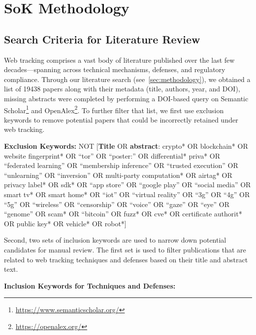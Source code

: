 \section{SoK Methodology}
\label{sec:appendix-methodology}

\subsection{Search Criteria for Literature Review}
\label{sec:keywords}

Web tracking comprises a vast body of literature published over the last few decades---spanning across technical mechanisms, defenses, and regulatory compliance. Through our literature search (see~\autoref{sec:methodology}), we obtained a list of 19438 papers along with their metadata (title, authors, year, and DOI), missing abstracts were completed by performing a DOI-based query on Semantic Scholar\footnote{\url{https://www.semanticscholar.org/}} and OpenAlex\footnote{\url{https://openalex.org/}}.
%
To further filter that list, we first use exclusion keywords to remove potential papers that could be incorrectly retained under web tracking.

\begin{exclusionkeywordbox}
\textbf{Exclusion Keywords:}
\noindent
NOT [\textbf{Title} OR \textbf{abstract}: crypto* OR
blockchain* OR
website fingerprint* OR
``tor'' OR
``poster:'' OR
differential* priva* OR
``federated learning'' OR
``membership inference'' OR
``trusted execution'' OR
``unlearning'' OR
``inversion'' OR
multi-party computation* OR
airtag* OR
privacy label* OR
sdk* OR
``app store'' OR
``google play'' OR
``social media'' OR
smart tv* OR
smart home* OR
``iot'' OR
``virtual reality'' OR
``3g'' OR
``4g'' OR
``5g'' OR
``wireless'' OR
``censorship'' OR
``voice'' OR
``gaze'' OR
``eye'' OR
``genome'' OR
scam* OR
``bitcoin'' OR
fuzz* OR
cve* OR
certificate authorit* OR
public key* OR
vehicle* OR
robot*]
\end{exclusionkeywordbox}

Second, two sets of inclusion keywords are used to narrow down potential candidates for manual review.
%
The first set is used to filter publications that are related to web tracking techniques and defenses based on their title and abstract text.


\begin{keywordbox}
\textbf{Inclusion Keywords for Techniques and Defenses:}
\end{keywordbox}


